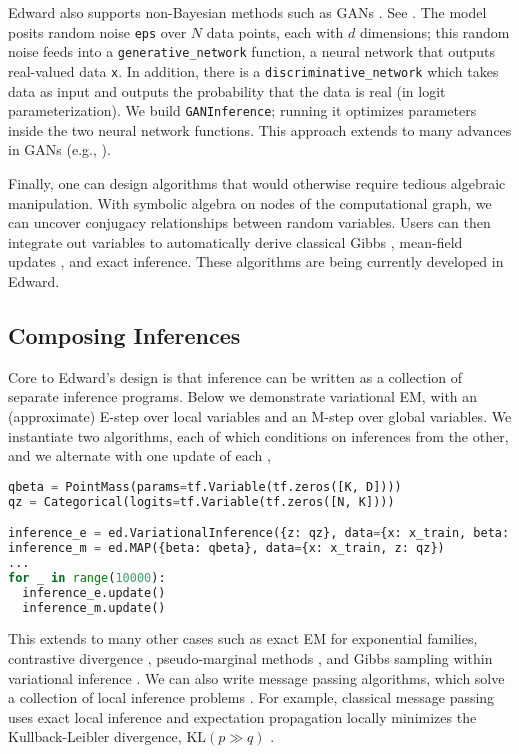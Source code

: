 Edward also supports non-Bayesian methods such as \glspl{GAN}
\citep{goodfellow2014generative}.
See .
The model posits
random noise \texttt{eps} over $N$ data points, each with $d$
dimensions; this random noise feeds into a
\texttt{generative_network} function, a neural network that outputs
real-valued data \texttt{x}.
In addition, there is a \texttt{discriminative_network}
which takes data as input and outputs the probability that
the data is real (in logit parameterization). We build
\texttt{GANInference}; running it optimizes parameters inside the two
neural network functions. This approach extends to many advances in
\glspl{GAN} (e.g., \citet{denton2015deep,li2015generative}).

Finally, one can design algorithms that would otherwise require tedious
algebraic manipulation. With symbolic algebra on nodes of the
computational graph, we can uncover conjugacy relationships between
random variables. Users can then integrate out variables to
automatically derive classical Gibbs \citep{gelfand1990sampling},
mean-field updates \citep{bishop2006pattern}, and exact inference.
These algorithms are being currently developed in Edward.

\subsection{Composing Inferences}

Core to Edward's design is that inference can be written as a collection
of separate inference programs. Below we demonstrate variational EM,
with an (approximate) E-step over local variables and an M-step over
global variables. We instantiate two algorithms, each of which
conditions on inferences from the other, and
we alternate with one update of each \citep{neal1993new},
\begin{lstlisting}[language=Python]
qbeta = PointMass(params=tf.Variable(tf.zeros([K, D])))
qz = Categorical(logits=tf.Variable(tf.zeros([N, K])))

inference_e = ed.VariationalInference({z: qz}, data={x: x_train, beta: qbeta})
inference_m = ed.MAP({beta: qbeta}, data={x: x_train, z: qz})
...
for _ in range(10000):
  inference_e.update()
  inference_m.update()
\end{lstlisting}
This extends to many other cases such as
exact EM for exponential families,
contrastive divergence \citep{hinton2002training},
pseudo-marginal methods \citep{andrieu2009pseudo},
and Gibbs sampling within variational inference
\citep{wang2012truncation,Hoffman:2015}.
We can also write message passing algorithms, which solve a collection
of local inference problems \citep{koller2009probabilistic}.  For
example, classical message passing uses exact local inference and
expectation propagation locally minimizes the Kullback-Leibler
divergence, $\text{KL}(p\gg q)$
\citep{minka2001expectation}.

